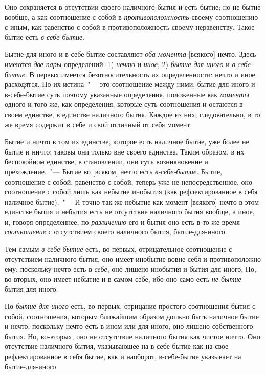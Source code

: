 Оно сохраняется в отсутствии своего наличного бытия
и есть бытие; но не бытие вообще, а как соотношение
с собой в \emph{противоположность} своему соотношению с иным,
как равенство с собой в противоположность своему неравенству.
Такое бытие есть \emph{в-себе-бытие}.

Бытие-для-иного и в-себе-бытие составляют \emph{оба момента}
[всякого] нечто. Здесь имеются \emph{две пары} определений:
1) \emph{нечто} и \emph{иное}; 2) \emph{бытие-для-иного} и \emph{в-себе-бытие}.
В первых имеется безотносительность их определенности:
нечто и иное расходятся. Но их истина~"--- это соотношение
между ними; бытие-для-иного и в-себе-бытие
суть поэтому указанные определения, положенные как \emph{моменты}
одного и того же, как определения, которые суть
соотношения и остаются в своем единстве, в единстве наличного
бытия. Каждое из них, следовательно, в то же время
содержит в себе и свой отличный от себя момент.

Бытие и ничто в том их единстве, которое есть наличное
бытие, уже более не бытие и ничто: таковы они только
вне своего единства. Таким образом, в их беспокойном
единстве, в становлении, они суть возникновение и
прехождение.~"--- Бытие во [всяком] нечто есть \emph{в-себе-бытие}.
Бытие, соотношение с собой, равенство с собой,
теперь уже не непосредственное, оно соотношение с собой
лишь как небытие инобытия (как рефлектированное
в себя наличное бытие).~"--- И точно так же небытие как
момент [всякого] нечто в этом единстве бытия и небытия
есть не отсутствие наличного бытия вообще, а иное,
и, говоря определеннее, по \emph{различению} его и бытия оно
есть в то же время \emph{соотношение} с отсутствием своего
наличного бытия, бытие-для-иного.

Тем самым \emph{в-себе-бытие} есть, во-первых, отрицательное
соотношение с отсутствием наличного бытия, оно
имеет инобытие вовне себя и противоположно ему;
поскольку нечто есть в \emph{себе}, оно лишено инобытия и бытия
для иного. Но, во-вторых, оно имеет небытие и в самом
себе, ибо оно само есть \emph{не-бытие} бытия-для-иного.

Но \emph{бытие-для-иного} есть, во-первых, отрицание простого
соотношения бытия с собой, соотношения, которым
ближайшим образом должно быть наличное бытие и нечто;
поскольку нечто есть в ином или для иного, оно лишено
собственного бытия. Но, во-вторых, оно не отсутствие
наличного бытия как чистое ничто. Оно отсутствие
наличного бытия, указывающее на в-себе-бытие как на
свое рефлектированное в себя бытие, как и наоборот,
в-себе-бытие указывает на бытие-для-иного.

